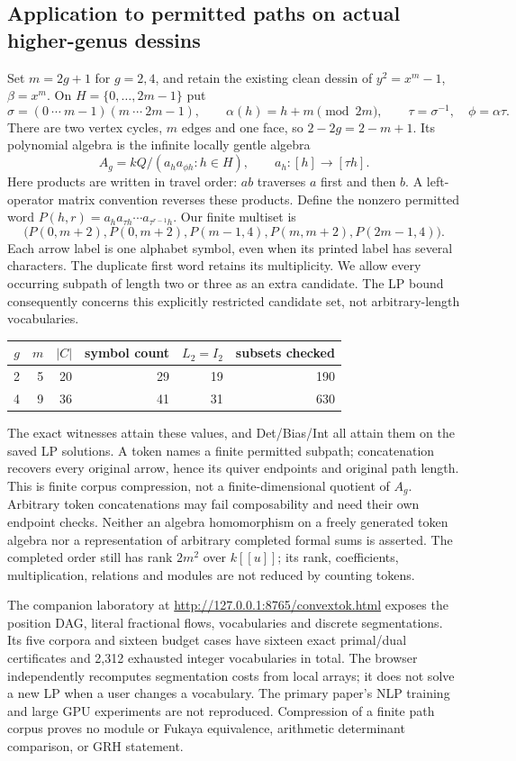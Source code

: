 \subsection{Application to permitted paths on actual higher-genus dessins}
Set $m=2g+1$ for $g=2,4$, and retain the existing clean dessin of
$y^2=x^m-1$, $\beta=x^m$. On $H=\{0,\ldots,2m-1\}$ put
\[
 \sigma=(0\ \cdots\ m-1)(m\ \cdots\ 2m-1),\qquad
 \alpha(h)=h+m\pmod{2m},\qquad \tau=\sigma^{-1},\quad\phi=\alpha\tau.
\]
There are two vertex cycles, $m$ edges and one face, so
$2-2g=2-m+1$. Its polynomial algebra is the infinite locally gentle
algebra
\[
 A_g=kQ/(a_h a_{\phi h}:h\in H),\qquad
 a_h:[h]\longrightarrow[\tau h].
\]
Here products are written in travel order: $ab$ traverses $a$ first and
then $b$. A left-operator matrix convention reverses these products.
Define the nonzero permitted word
$P(h,r)=a_h a_{\tau h}\cdots a_{\tau^{r-1}h}$. Our finite multiset is
\[
 \big(P(0,m+2),P(0,m+2),P(m-1,4),
      P(m,m+2),P(2m-1,4)\big).
\]
Each arrow label is one alphabet symbol, even when its printed label has
several characters. The duplicate first word retains its multiplicity.
We allow every occurring subpath of length two or three as an extra
candidate. The LP bound consequently concerns this explicitly restricted
candidate set, not arbitrary-length vocabularies.
\begin{center}\small
\begin{tabular}{rrrrrr}
\toprule
$g$ & $m$ & $|C|$ & symbol count & $L_2=I_2$ & subsets checked\\
\midrule
2&5&20&29&19&190\\
4&9&36&41&31&630\\
\bottomrule
\end{tabular}
\end{center}
The exact witnesses attain these values, and Det/Bias/Int all attain
them on the saved LP solutions. A token names a finite permitted subpath;
concatenation recovers every original arrow, hence its quiver endpoints
and original path length. This is finite corpus compression, not a
finite-dimensional quotient of $A_g$. Arbitrary token concatenations may
fail composability and need their own endpoint checks. Neither an algebra
homomorphism on a freely generated token algebra nor a representation of
arbitrary completed formal sums is asserted. The completed order still
has rank $2m^2$ over $k[[u]]$; its rank, coefficients, multiplication,
relations and modules are not reduced by counting tokens.

The companion laboratory at
\url{http://127.0.0.1:8765/convextok.html} exposes the position DAG,
literal fractional flows, vocabularies and discrete segmentations.
Its five corpora and sixteen budget cases have sixteen exact
primal/dual certificates and 2,312 exhausted integer vocabularies in
total. The browser independently recomputes segmentation costs from
local arrays; it does not solve a new LP when a user changes a vocabulary.
The primary paper's NLP training and large GPU experiments are not
reproduced. Compression of a finite path corpus proves no module or
Fukaya equivalence, arithmetic determinant comparison, or GRH statement.
